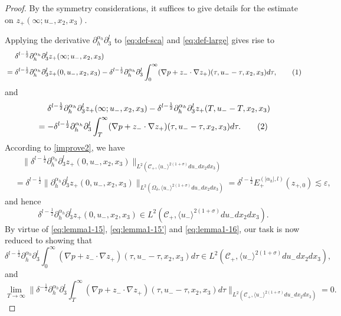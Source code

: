 \documentclass[10pt,reqno]{amsart}
\numberwithin{equation}{section}
\begin{document}
\begin{proof}
		By the symmetry considerations, it suffices to give details for the estimate on $z_{+}(\infty;u_-,x_2,x_3)$.
		
Applying the derivative $	\partial_h^{\alpha_h}\partial_3^l$ to 	\eqref{eq:def-sca} and \eqref{eq:def-large} gives rise to 
	\begin{align*} 
	&\ \ \ \ 	\delta^{l-\frac{1}{2}}\partial_h^{\alpha_h}\partial_3^l z_{+}(\infty;u_-,x_2,x_3)\\
	&=\delta^{l-\frac{1}{2}}\partial_h^{\alpha_h}\partial_3^l z_{+}(0,u_-,x_2,x_3)-\delta^{l-\frac{1}{2}}\partial_h^{\alpha_h}\partial_3^l\int_0^{\infty} (\nabla p+z_{-}\cdot\nabla z_{+}) 
		(\tau,u_--\tau,x_2,x_3)d\tau,\stepcounter{equation}\tag{\theequation}\label{eq:lemma1-15}
	\end{align*}
and 
	\begin{align*} 
&\ \ \ \ 	\delta^{l-\frac{1}{2}}\partial_h^{\alpha_h}\partial_3^l z_{+}(\infty;u_-,x_2,x_3)-\delta^{l-\frac{1}{2}}\partial_h^{\alpha_h}\partial_3^l z_{+}(T,u_--T,x_2,x_3)
\\&
=-\delta^{l-\frac{1}{2}}\partial_h^{\alpha_h}\partial_3^l\int_T^{\infty} (\nabla p+z_{-}\cdot\nabla z_{+}) 
	(\tau,u_--\tau,x_2,x_3)d\tau.\stepcounter{equation}\tag{\theequation}\label{eq:lemma1-15'}
\end{align*}
According to \eqref{improve2}, we have
	\begin{align*}
		&\ \ \ \ 	\big\|\delta^{l-\frac{1}{2}}\partial_h^{\alpha_h}\partial_3^lz_+(0,u_-,x_2,x_3)\big\|_{L^2(\mathcal{C}_+,\langle u_-\rangle^{2(1+\sigma)}du_-dx_2dx_3)}\\
		&	=\delta^{l-\frac{1}{2}} \big\|\partial_h^{\alpha_h}\partial_3^lz_+(0,u_-,x_2,x_3)\big\|_{L^2(\Omega_\delta,\langle u_-\rangle^{2(1+\sigma)}du_-dx_2dx_3)}		=\delta^{l-\frac{1}{2}}E_+^{(|\alpha_h|,l)}(z_{+,0})
		\lesssim 
		\varepsilon,
	\end{align*}
and hence 
	\begin{equation}\label{eq:lemma1-16}
		\delta^{l-\frac{1}{2}}\partial_h^{\alpha_h}\partial_3^l z_{+}(0,u_-,x_2,x_3)\in L^2(\mathcal{C}_+,\langle u_-\rangle^{2(1+\sigma)}du_-dx_2dx_3).
	\end{equation}
By virtue of \eqref{eq:lemma1-15}, \eqref{eq:lemma1-15'} and \eqref{eq:lemma1-16}, our task is now reduced to showing that
	\begin{equation}\label{eq:lemma1-26}
	\delta^{l-\frac{1}{2}}	\partial_h^{\alpha_h}\partial_3^l\int_0^{\infty} (\nabla p+z_{-}\cdot\nabla z_{+}) 
		(\tau,u_--\tau,x_2,x_3)d\tau\in L^2(\mathcal{C}_+,\langle u_-\rangle^{2(1+\sigma)}du_-dx_2dx_3),
	\end{equation}
and 
\begin{equation}\label{eq:lemma1-26'}
	\lim_{T\to \infty}\Big\|\delta^{-\frac{1}{2}}\partial_h^{\alpha_h}\partial_3^l\int_T^{\infty}  (\nabla p+z_{-}\cdot\nabla z_{+}) 
	(\tau,u_--\tau,x_2,x_3)d\tau\Big\|_{L^2(\mathcal{C}_+,\langle u_-\rangle^{2(1+\sigma)}du_-dx_2dx_3)}=0.
\end{equation}
	

\end{proof}
\end{document}
